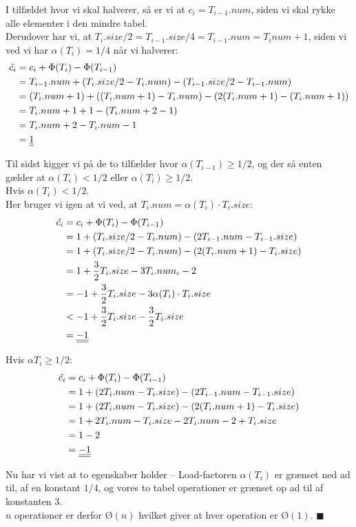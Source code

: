 I tilfældet hvor vi skal halverer, så er vi at $c_i= T_{i-1}.num$, siden vi skal rykke alle elementer i den mindre tabel.\\
Derudover har vi, at $T_{i}.size/2 = T_{i-1}.size/4 = T_{i-1}.num = T_inum + 1$, siden vi ved vi har $\alpha(T_i) = 1/4$ når vi halverer:
\begin{align*}
  \hat{c_i} &= c_i + \Phi(T_i) - \Phi(T_{i-1})\\
            &= T_{i-1}.num + (T_i.size/2 - T_i.num) - (T_{i-1}.size/2 - T_{i-1}.num)\\
            &= (T_i.num + 1) + ((T_i.num + 1) - T_i.num) - (2(T_i.num + 1) - (T_i.num + 1))\\
            &= T_i.num + 1 + 1 - (T_i.num + 2 - 1)\\
            &= T_i.num + 2 - T_i.num - 1\\
            &= \underline{\underline{1}}
\end{align*}

Til sidst kigger vi på de to tilfælder hvor $\alpha(T_{i-1}) \geq 1/2$, og der så enten gælder at $\alpha(T_i) < 1/2$ eller $\alpha(T_i) \geq 1/2$.\\

Hvis $\alpha(T_i) < 1/2$.\\
Her bruger vi igen at vi ved, at $T_i.num = \alpha(T_i)\cdot T_i.size$:
\begin{align*}
  \hat{c_i} &= c_i + \Phi(T_i) - \Phi(T_{i-1})\\
            &= 1 + (T_i.size/2 - T_i.num) - (2T_{i-1}.num - T_{i-1}.size)\\
            &= 1 + (T_i.size/2 - T_i.num) - (2(T_i.num + 1) - T_i.size)\\
            &= 1 + \frac{3}{2}T_i.size - 3T_i.num_i - 2\\
            &= -1 + \frac{3}{2}T_i.size - 3\alpha(T_i) \cdot T_i.size\\
            &< -1 + \frac{3}{2}T_i.size - \frac{3}{2}T_i.size\\
            &= \underline{\underline{-1}}
\end{align*}

Hvis $\alpha{T_i} \geq 1/2$:
\begin{align*}
  \hat{c_i} &= c_i + \Phi(T_i) - \Phi(T_{i-1})\\
            &= 1 + (2T_i.num - T_i.size) - (2T_{i-1}.num - T_{i-1}.size)\\
            &= 1 + (2T_i.num - T_i.size) - (2(T_i.num + 1) - T_i.size)\\
            &= 1 + 2T_i.num - T_i.size - 2T_i.num - 2 + T_i.size\\
            &= 1 - 2\\
            &= \underline{\underline{-1}}
\end{align*}

Nu har vi vist at to egenskaber holder -- Load-factoren $\alpha(T_i)$ er grænset ned ad til, af en konstant $1/4$, og vores to tabel operationer er grænset op ad til af konstanten 3.\\
$n$ operationer er derfor $Ø(n)$ hvilket giver at hver operation er $Ø(1)$. $\blacksquare$
